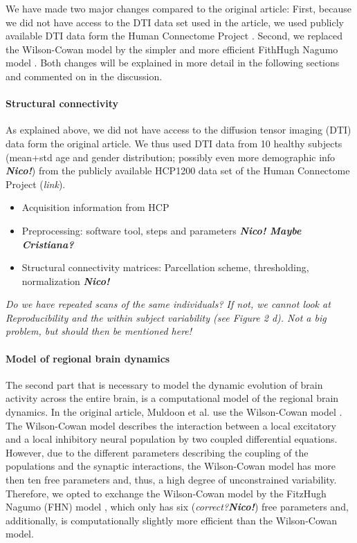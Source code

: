 We have made two major changes compared to the original article: First, because we did not have access to the DTI data set used in the article, we used publicly
available DTI data form the Human Connectome Project \supercite{}. Second, we replaced the Wilson-Cowan model \supercite{Wilson1972} by the simpler and 
more efficient FithHugh Nagumo model \supercite{FitzHugh1961}. Both changes will be explained in more detail in the following sections and commented on in the 
discussion.
\paragraph{Structural connectivity}
As explained above, we did not have access to the diffusion tensor imaging (DTI) data form the original article. We thus used DTI data from 10 healthy
subjects (mean+std age and gender distribution; possibly even more demographic info \textbf{\textit{Nico!}}) from the publicly available HCP1200 data set of the
Human Connectome Project (\textit{link}).

\begin{itemize}
 \item 
  Acquisition information from HCP
 \item
  Preprocessing: software tool, steps and parameters  \textbf{\textit{Nico! Maybe Cristiana?}}
 \item
  Structural connectivity matrices: Parcellation scheme, thresholding, normalization \textbf{\textit{Nico!}}
\end{itemize}

\textit{Do we have repeated scans of the same individuals? If not, we cannot look at Reproducibility and the within subject
variability (see Figure 2 d). Not a big problem, but should then be mentioned here!}

\paragraph{Model of regional brain dynamics}
The second part that is necessary to model the dynamic evolution of brain activity across the entire brain, is a computational model of the
regional brain dynamics. In the original article, Muldoon et al. \supercite{Muldoon2016} use the Wilson-Cowan model \supercite{Wilson1972}. The Wilson-Cowan model
describes the interaction between a local excitatory and a local inhibitory neural population by two coupled differential equations. However, due to the different
parameters describing the coupling of the populations and the synaptic interactions, the Wilson-Cowan model has more then ten free parameters and, thus,
a high degree of unconstrained variability. Therefore, we opted to exchange the Wilson-Cowan model by the FitzHugh Nagumo (FHN) model \supercite{FitzHugh1961}, which
only has six (\textit{correct?}\textbf{\textit{Nico!}}) free parameters and, additionally, is computationally slightly more efficient than the Wilson-Cowan model.


